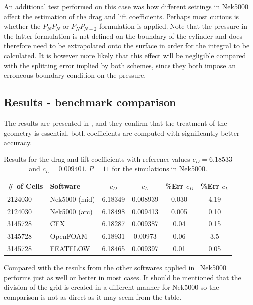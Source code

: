 An additional test performed on this case was how different settings in Nek5000 affect the estimation of the drag and lift coefficients.
Perhaps most curious is whether the $P_NP_N$ or $P_NP_{N-2}$ formulation is applied. Note that the pressure in the latter formulation is 
not defined on the boundary of the cylinder and does therefore need to be extrapolated onto the surface in order for the integral to be 
calculated. It is however more likely that this effect will be negligible compared with the splitting error implied by both schemes, 
since they both impose an erroneous boundary condition on the pressure.
%
\subsection{Results - benchmark comparison}
The results are presented in , and they confirm that the treatment of the geometry is 
essential, both coefficients are computed with significantly better accuracy. 
%
\begin{table}[h]
\centering
\begin{tabular}{l l c c c c}
		\toprule
		\# of Cells & Software & $c_D$ & $c_L$ & \%\textbf{Err} $c_D$ &\%\textbf{Err} $c_L$ \\ \midrule 
		2124030& Nek5000 (mid) & 6.18349 & 0.008939 & 0.030 & 4.19 \\ 
		2124030& Nek5000 (arc) & 6.18498 & 0.009413 & 0.005 & 0.10 \\
		3145728 & CFX 		 & 6.18287 & 0.009387 & 0.04 &0.15 \\
		3145728 & OpenFOAM	 & 6.18931 & 0.00973 & 0.06 &3.5 \\
		3145728 & FEATFLOW   & 6.18465 & 0.009397 & 0.01 &0.05 \\
		\bottomrule	
	\end{tabular}
	\caption{Results for the drag and lift coefficients with reference values 
	$c_D = 6.18533$ and $c_L = 0.009401$. $P=11$ for the simulations in Nek5000.}
\label{tab:testcase}
\end{table}
%
Compared with the results from the other softwares applied in~\cite{benchmark} Nek5000 performs 
just as well or better in most cases. It should be mentioned that the division of the grid is created
in a different manner for Nek5000 so the comparison is not as direct as it may seem from the table.

